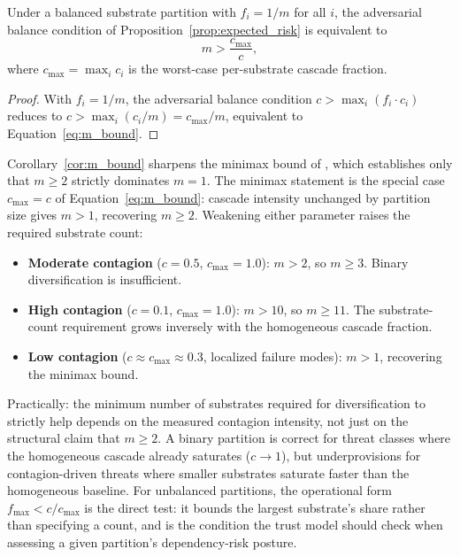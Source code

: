 \begin{corollary}
\label{cor:m_bound}
Under a balanced substrate partition with $f_i = 1/m$ for all $i$,
the adversarial balance condition of
Proposition~\ref{prop:expected_risk} is equivalent to
\begin{equation}
\label{eq:m_bound}
m > \frac{c_{\max}}{c},
\end{equation}
where $c_{\max} = \max_i c_i$ is the worst-case per-substrate
cascade fraction.
\end{corollary}

\begin{proof}
With $f_i = 1/m$, the adversarial balance condition
$c > \max_i (f_i \cdot c_i)$ reduces to
$c > \max_i (c_i / m) = c_{\max} / m$, equivalent to Equation~\eqref{eq:m_bound}.
\end{proof}

Corollary~\ref{cor:m_bound} sharpens the minimax bound of
\citet{lasser2026horizon}, which establishes only that $m \geq 2$
strictly dominates $m = 1$. The minimax statement is the special
case $c_{\max} = c$ of Equation~\eqref{eq:m_bound}: cascade
intensity unchanged by partition size gives $m > 1$, recovering
$m \geq 2$. Weakening either parameter raises the required
substrate count:
\begin{itemize}
\item \textbf{Moderate contagion} ($c = 0.5$, $c_{\max} = 1.0$):
    $m > 2$, so $m \geq 3$. Binary diversification is insufficient.
\item \textbf{High contagion} ($c = 0.1$, $c_{\max} = 1.0$):
    $m > 10$, so $m \geq 11$. The substrate-count requirement grows
    inversely with the homogeneous cascade fraction.
\item \textbf{Low contagion} ($c \approx c_{\max} \approx 0.3$,
    localized failure modes): $m > 1$, recovering the minimax bound.
\end{itemize}
Practically: the minimum number of substrates required for
diversification to strictly help depends on the measured contagion
intensity, not just on the structural claim that $m \geq 2$.
A binary partition is correct for threat classes where the
homogeneous cascade already saturates ($c \to 1$), but
underprovisions for contagion-driven threats where smaller
substrates saturate faster than the homogeneous baseline. For
unbalanced partitions, the operational form
$f_{\max} < c / c_{\max}$ is the direct test: it bounds the largest
substrate's share rather than specifying a count, and is the
condition the trust model should check when assessing a given
partition's dependency-risk posture.

